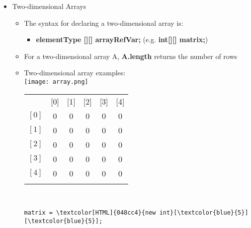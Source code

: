 \begin{itemize}
	\item Two-dimensional Arrays
	\begin{itemize}
		\item The syntax for declaring a two-dimensional array is:
		\begin{itemize}
			\item \textbf{elementType [][] arrayRefVar;} (e.g. \textbf{int[][] matrix;})
		\end{itemize}
		\item For a two-dimensional array A, \textbf{A.length} returns the number of rows
		\item Two-dimensional array examples:\\
		\texttt{[image: array.png]}\\
		\begin{minipage}{2.3in}
			\centering
				\begin{tabular}{c | c | c | c | c | c |}
					\multicolumn{1}{c}{\phantom{text}} & \multicolumn{1}{c}{[0]} & \multicolumn{1}{c}{[1]} & \multicolumn{1}{c}{[2]} & \multicolumn{1}{c}{[3]} & \multicolumn{1}{c}{[4]}\\\hhline{~|-----}
					$ \left[0\right] $ & \cellcolor{Arraycolor}0 & \cellcolor{Arraycolor}0 & \cellcolor{Arraycolor}0 & \cellcolor{Arraycolor}0 & \cellcolor{Arraycolor}0\\\hhline{~|-----}
					$ \left[1\right] $ & \cellcolor{Arraycolor}0 & \cellcolor{Arraycolor}0 & \cellcolor{Arraycolor}0 & \cellcolor{Arraycolor}0 & \cellcolor{Arraycolor}0\\\hhline{~|-----}
					$ \left[2\right] $ & \cellcolor{Arraycolor}0 & \cellcolor{Arraycolor}0 & \cellcolor{Arraycolor}0 & \cellcolor{Arraycolor}0 & \cellcolor{Arraycolor}0\\\hhline{~|-----}
					$ \left[3\right] $ & \cellcolor{Arraycolor}0 & \cellcolor{Arraycolor}0 & \cellcolor{Arraycolor}0 & \cellcolor{Arraycolor}0 & \cellcolor{Arraycolor}0\\\hhline{~|-----}
					$ \left[4\right] $ & \cellcolor{Arraycolor}0 & \cellcolor{Arraycolor}0 & \cellcolor{Arraycolor}0 & \cellcolor{Arraycolor}0 & \cellcolor{Arraycolor}0\\\hhline{~|-----}
				\end{tabular}\\
					\begin{Verbatim}[commandchars=\\\{\}]
    matrix = \textcolor[HTML]{048cc4}{new int}[\textcolor{blue}{5}][\textcolor{blue}{5}];

\end{Verbatim}
\end{minipage}
\end{itemize}
\end{itemize}
